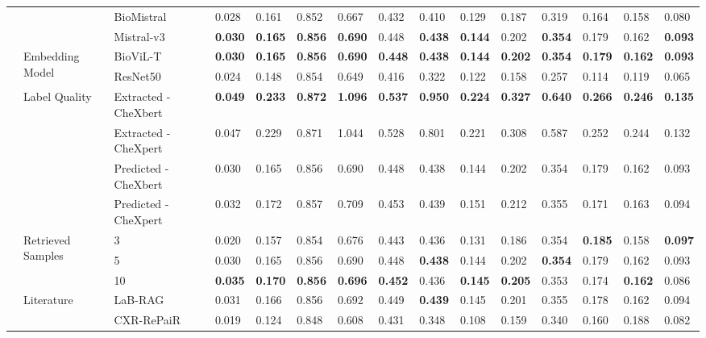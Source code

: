 \begin{tabular}{lllllllllllllll}
 &  & BioMistral & 0.028 & 0.161 & 0.852 & 0.667 & 0.432 & 0.410 & 0.129 & 0.187 & 0.319 & 0.164 & 0.158 & 0.080 \\
 &  & Mistral-v3 & \textbf{0.030} & \textbf{0.165} & \textbf{0.856} & \textbf{0.690} & 0.448 & \textbf{0.438} & \textbf{0.144} & 0.202 & \textbf{0.354} & 0.179 & 0.162 & \textbf{0.093} \\
\cmidrule{2-15}
 & \multirow[c]{2}{*}{Embedding Model} & BioViL-T & \textbf{0.030} & \textbf{0.165} & \textbf{0.856} & \textbf{0.690} & \textbf{0.448} & \textbf{0.438} & \textbf{0.144} & \textbf{0.202} & \textbf{0.354} & \textbf{0.179} & \textbf{0.162} & \textbf{0.093} \\
 &  & ResNet50 & 0.024 & 0.148 & 0.854 & 0.649 & 0.416 & 0.322 & 0.122 & 0.158 & 0.257 & 0.114 & 0.119 & 0.065 \\
\cmidrule{2-15}
 & \multirow[c]{4}{*}{Label Quality} & Extracted - CheXbert & \textbf{0.049} & \textbf{0.233} & \textbf{0.872} & \textbf{1.096} & \textbf{0.537} & \textbf{0.950} & \textbf{0.224} & \textbf{0.327} & \textbf{0.640} & \textbf{0.266} & \textbf{0.246} & \textbf{0.135} \\
 &  & Extracted - CheXpert & 0.047 & 0.229 & 0.871 & 1.044 & 0.528 & 0.801 & 0.221 & 0.308 & 0.587 & 0.252 & 0.244 & 0.132 \\
 &  & Predicted - CheXbert & 0.030 & 0.165 & 0.856 & 0.690 & 0.448 & 0.438 & 0.144 & 0.202 & 0.354 & 0.179 & 0.162 & 0.093 \\
 &  & Predicted - CheXpert & 0.032 & 0.172 & 0.857 & 0.709 & 0.453 & 0.439 & 0.151 & 0.212 & 0.355 & 0.171 & 0.163 & 0.094 \\
\cmidrule{2-15}
 & \multirow[c]{3}{*}{Retrieved Samples} & 3 & 0.020 & 0.157 & 0.854 & 0.676 & 0.443 & 0.436 & 0.131 & 0.186 & 0.354 & \textbf{0.185} & 0.158 & \textbf{0.097} \\
 &  & 5 & 0.030 & 0.165 & 0.856 & 0.690 & 0.448 & \textbf{0.438} & 0.144 & 0.202 & \textbf{0.354} & 0.179 & 0.162 & 0.093 \\
 &  & 10 & \textbf{0.035} & \textbf{0.170} & \textbf{0.856} & \textbf{0.696} & \textbf{0.452} & 0.436 & \textbf{0.145} & \textbf{0.205} & 0.353 & 0.174 & \textbf{0.162} & 0.086 \\
\cmidrule{2-15}
 & \multirow[c]{6}{*}{Literature} & LaB-RAG & 0.031 & 0.166 & 0.856 & 0.692 & 0.449 & \textbf{0.439} & 0.145 & 0.201 & 0.355 & 0.178 & 0.162 & 0.094 \\
 &  & CXR-RePaiR & 0.019 & 0.124 & 0.848 & 0.608 & 0.431 & 0.348 & 0.108 & 0.159 & 0.340 & 0.160 & 0.188 & 0.082 \\

\end{tabular}
